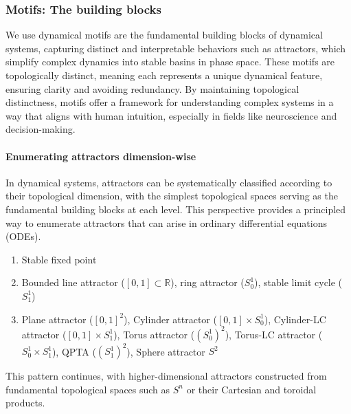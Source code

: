\documentclass{article}
\theoremstyle{definition} \newtheorem{definition}{Definition}  \newtheorem{example}{Example}
\theoremstyle{remark} \newtheorem{remark}{Remark}
\newcommand{\reals}{\mathbb{R}}
\newcounter{ct}
\begin{document}
\subsubsection{Motifs: The building blocks}
We use dynamical motifs are the fundamental building blocks of dynamical systems, capturing distinct and interpretable behaviors such as attractors, which simplify complex dynamics into stable basins in phase space.
 These motifs are topologically distinct, meaning each represents a unique dynamical feature, ensuring clarity and avoiding redundancy.
  By maintaining topological distinctness, motifs offer a framework for understanding complex systems in a way that aligns with human intuition, especially in fields like neuroscience and decision-making.




\paragraph{Enumerating attractors dimension-wise}
In dynamical systems, attractors can be systematically classified according to their topological dimension, with the simplest topological spaces serving as the fundamental building blocks at each level. This perspective provides a principled way to enumerate attractors that can arise in ordinary differential equations (ODEs).
\begin{enumerate}[start=0,label={\bfseries Dim \arabic*:}]
\item  Stable fixed point
\item  Bounded line attractor ($[0,1]\subset\reals$), ring attractor ($S_0^1$), stable limit cycle ($S_1^1$)
\item Plane attractor ($[0,1]^2$), Cylinder attractor ($[0,1]\times S_0^1$), Cylinder-LC attractor ($[0,1]\times S_1^1$), Torus attractor ($(S_0^1)^2$), Torus-LC attractor ($S_0^1\times S_1^1$), QPTA ($(S_1^1)^2$), Sphere attractor $S^2$
\end{enumerate}
This pattern continues, with higher-dimensional attractors constructed from fundamental topological spaces such as $S^n$ or their Cartesian and toroidal products.
\end{document}
